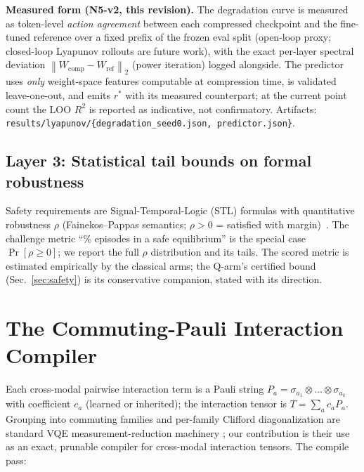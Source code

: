 \documentclass[conference,10pt]{IEEEtran}
\newcommand{\norm}[1]{\left\lVert #1 \right\rVert}
\begin{document}
\textbf{Measured form (N5-v2, this revision).} The degradation curve is
measured as token-level \emph{action agreement} between each compressed
checkpoint and the fine-tuned reference over a fixed prefix of the frozen
eval split (open-loop proxy; closed-loop Lyapunov rollouts are future work),
with the exact per-layer spectral deviation $\norm{W_{\mathrm{comp}} - W_{\mathrm{ref}}}_2$
(power iteration) logged alongside. The predictor uses \emph{only}
weight-space features computable at compression time, is validated
leave-one-out, and emits $r^*$ with its measured counterpart; at the current
point count the LOO $R^2$ is reported as indicative, not confirmatory.
Artifacts: \texttt{results/lyapunov/\{degradation\_seed0.json, predictor.json\}}.

\subsection{Layer 3: Statistical tail bounds on formal robustness}

Safety requirements are Signal-Temporal-Logic (STL) formulas with quantitative
robustness $\rho$ (Fainekos--Pappas semantics; $\rho>0$ = satisfied with
margin)~\cite{stl}. The challenge metric ``\% episodes in a safe equilibrium''
is the special case $\Pr[\rho \ge 0]$; we report the full $\rho$ distribution
and its tails. The scored metric is estimated empirically by the classical arms;
the Q-arm's certified bound (Sec.~\ref{sec:safety}) is its conservative
companion, stated with its direction.

\section{The Commuting-Pauli Interaction Compiler}
\label{sec:compiler}

Each cross-modal pairwise interaction term is a Pauli string
$P_a = \sigma_{a_1}\otimes\dots\otimes\sigma_{a_k}$ with coefficient $c_a$
(learned or inherited); the interaction tensor is $T = \sum_a c_a P_a$. Grouping into commuting families
and per-family Clifford diagonalization are standard VQE measurement-reduction
machinery \cite{reggio,knoclid}; our contribution is their use as an exact,
prunable compiler for cross-modal interaction tensors.
The compile pass:
\end{document}
